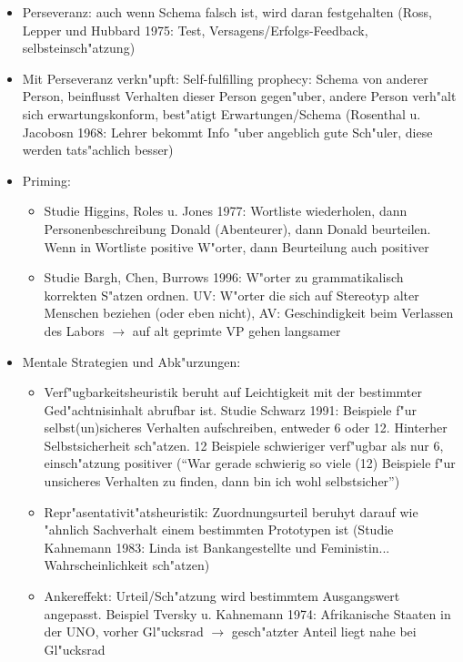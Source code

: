 \begin{itemize}
	\item
		Perseveranz: auch wenn Schema falsch ist, wird daran festgehalten (Ross, Lepper und Hubbard 1975: Test, Versagens/Erfolgs-Feedback, selbsteinsch"atzung)
	\item
		Mit Perseveranz verkn"upft: Self-fulfilling prophecy: Schema von anderer Person, beinflusst Verhalten dieser Person gegen"uber, andere Person verh"alt sich erwartungskonform, best"atigt Erwartungen/Schema (Rosenthal u. Jacobosn 1968: Lehrer bekommt Info "uber angeblich gute Sch"uler, diese werden tats"achlich besser)
	\item
		Priming:
		\begin{itemize}
			\item
				Studie Higgins, Roles u. Jones 1977: Wortliste wiederholen, dann Personenbeschreibung Donald (Abenteurer), dann Donald beurteilen. Wenn in Wortliste positive W"orter, dann Beurteilung auch positiver
			\item
				Studie Bargh, Chen, Burrows 1996: W"orter zu grammatikalisch korrekten S"atzen ordnen. UV: W"orter die sich auf Stereotyp alter Menschen beziehen (oder eben nicht), AV: Geschindigkeit beim Verlassen des Labors  $\rightarrow$ auf alt geprimte VP gehen langsamer
		\end{itemize}
	\item
		Mentale Strategien und Abk"urzungen:
		\begin{itemize}
			\item Verf"ugbarkeitsheuristik beruht auf Leichtigkeit mit der bestimmter Ged"achtnisinhalt abrufbar ist. Studie Schwarz 1991: Beispiele f"ur selbst(un)sicheres Verhalten aufschreiben, entweder 6 oder 12. Hinterher Selbstsicherheit sch"atzen. 12 Beispiele schwieriger verf"ugbar als nur 6, einsch"atzung positiver (\enquote{War gerade schwierig so viele (12) Beispiele f"ur unsicheres Verhalten zu finden, dann bin ich wohl selbstsicher})
			\item
				Repr"asentativit"atsheuristik: Zuordnungsurteil beruhyt darauf wie "ahnlich Sachverhalt einem bestimmten Prototypen ist (Studie Kahnemann 1983: Linda ist Bankangestellte und Feministin... Wahrscheinlichkeit sch"atzen)
			\item
				Ankereffekt: Urteil/Sch"atzung wird bestimmtem Ausgangswert angepasst. Beispiel Tversky u. Kahnemann 1974: Afrikanische Staaten in der UNO, vorher Gl"ucksrad $\rightarrow$ gesch"atzter Anteil liegt nahe bei Gl"ucksrad
		\end{itemize}

\end{itemize}

